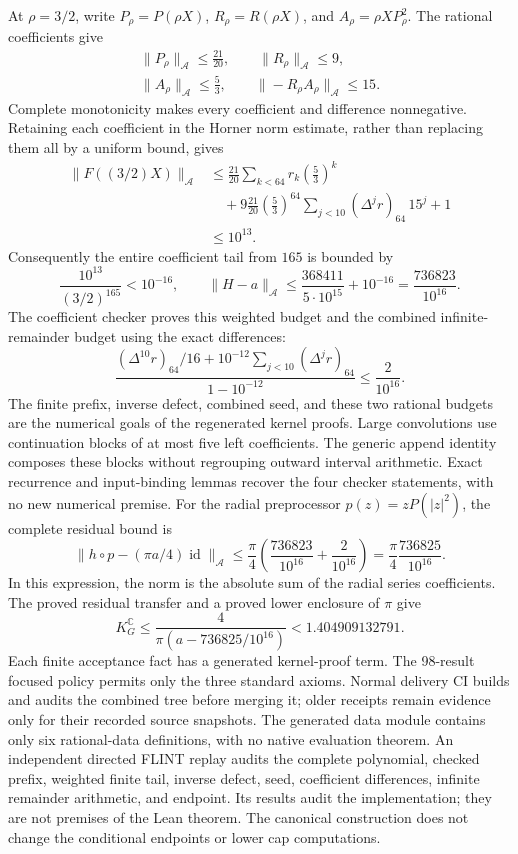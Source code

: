 At $\rho=3/2$, write $P_\rho=P(\rho X)$, $R_\rho=R(\rho X)$, and
$A_\rho=\rho X P_\rho^2$. The rational coefficients give
\[
 \begin{gathered}
 \|P_\rho\|_{\mathcal A}\le\frac{21}{20},\qquad
 \|R_\rho\|_{\mathcal A}\le9,\\
 \|A_\rho\|_{\mathcal A}\le\frac53,\qquad
 \|-R_\rho A_\rho\|_{\mathcal A}\le15.
 \end{gathered}
\]
Complete monotonicity makes every coefficient and difference nonnegative.
Retaining each coefficient in the Horner norm estimate, rather than replacing
them all by a uniform bound, gives
\begin{align*}
 \|F((3/2)X)\|_{\mathcal A}
 &\le \frac{21}{20}\sum_{k<64}r_k\left(\frac53\right)^k\\
 &\quad+9\frac{21}{20}\left(\frac53\right)^{64}
       \sum_{j<10}(\Delta^j r)_{64}\,15^j+1\\
 &\le10^{13}.
\end{align*}
Consequently the entire coefficient tail from $165$ is bounded by
\[
 \frac{10^{13}}{(3/2)^{165}}<10^{-16},
 \qquad
 \|H-a\|_{\mathcal A}\le\frac{368411}{5\cdot10^{15}}+10^{-16}
                         =\frac{736823}{10^{16}}.
\]
The coefficient checker proves this weighted budget and the combined
infinite-remainder budget using the exact differences:
\[
 \frac{(\Delta^{10}r)_{64}/16
       +10^{-12}\sum_{j<10}(\Delta^j r)_{64}}{1-10^{-12}}
 \le\frac{2}{10^{16}}.
\]
The finite prefix, inverse defect, combined seed, and these two rational
budgets are the numerical goals of the regenerated kernel proofs. Large
convolutions use continuation blocks of at most five left coefficients.
The generic append identity composes these blocks without regrouping outward
interval arithmetic. Exact recurrence and input-binding lemmas recover the
four checker statements, with no new numerical premise.
For the radial preprocessor $p(z)=zP(|z|^2)$, the complete residual bound is
\[
 \|h\circ p-(\pi a/4)\operatorname{id}\|_{\mathcal A}
 \le\frac\pi4\left(\frac{736823}{10^{16}}+\frac{2}{10^{16}}\right)
 =\frac\pi4\frac{736825}{10^{16}}.
\]
In this expression, the norm is the absolute sum of the radial series
coefficients. The proved residual transfer and a proved lower enclosure of
$\pi$ give
\[
 K_G^{\mathbb C}\le\frac4{\pi(a-736825/10^{16})}<1.404909132791.
\]
Each finite acceptance fact has a generated kernel-proof term.
The 98-result focused policy permits only the three standard axioms. Normal delivery CI builds and audits the combined tree before merging it;
older receipts remain evidence only for their recorded source snapshots.
The generated data module contains only six rational-data definitions, with no
native evaluation theorem. An independent directed FLINT replay audits
the complete polynomial, checked prefix, weighted finite tail, inverse defect,
seed, coefficient differences, infinite remainder arithmetic, and endpoint. Its results audit the implementation;
they are not premises of the Lean theorem. The canonical construction does not
change the conditional endpoints or lower cap computations.
